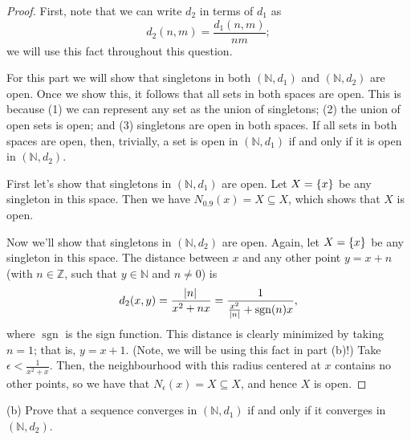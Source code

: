 \documentclass{article}
\DeclareMathOperator{\sgn}{sgn}
\newcommand{\N}{\mathbb{N}}
\newcommand{\Z}{\mathbb{Z}}
\begin{document}
\begin{proof}

First, note that we can write $d_2$ in terms of $d_1$ as
%
\begin{equation*}
    d_2(n, m) = \frac{d_1(n, m)}{n m}
    ;
\end{equation*}
%
we will use this fact throughout this question.

For this part we will show that singletons in both $(\N, d_1)$ and $(\N,
d_2)$ are open. Once we show this, it follows that all sets in both
spaces are open. This is because (1) we can represent any set as the
union of singletons; (2) the union of open sets is open; and (3)
singletons are open in both spaces. If all sets in both spaces are open,
then, trivially, a set is open in $(\N, d_1)$ if and only if it is open
in $(\N, d_2)$.

First let's show that singletons in $(\N, d_1)$ are open. Let $X =
\cbr{x}$ be any singleton in this space. Then we have $N_{0.9}(x)
= X \subseteq X$, which shows that $X$ is open.

Now we'll show that singletons in $(\N, d_2)$ are open. Again, let $X =
\cbr{x}$ be any singleton in this space. The distance between $x$ and
any other point $y = x + n$ (with $n \in \Z$, such that $y \in \N$ and
$n \neq 0$) is
%
\begin{equation*}
    d_2(x, y)
        = \frac{\envert{n}}{x^2 + n x}
        = \frac{1}{\frac{x^2}{|n|} + \sgn(n) x}
        ,
\end{equation*}
%
where $\sgn$ is the sign function. This distance is clearly minimized by
taking $n = 1$; that is, $y = x + 1$. (Note, we will be using this fact
in part (b)!) Take $\epsilon < \frac{1}{x^2 + x}$. Then, the
neighbourhood with this radius centered at $x$ contains no other points,
so we have that $N_\epsilon(x) = X \subseteq X$, and hence $X$ is open.

\end{proof}

\newpage

(b) Prove that a sequence converges in $(\N, d_1)$ if and only if it
converges in $(\N, d_2)$.
\end{document}
